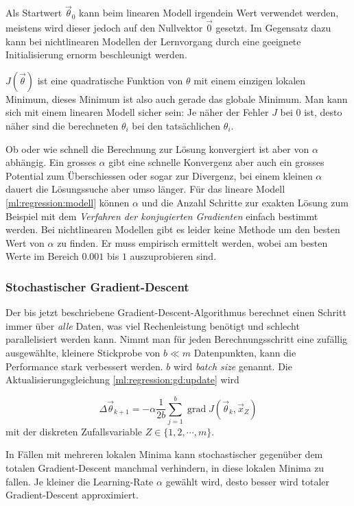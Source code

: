 Als Startwert $\vec\theta_0$ kann beim linearen Modell irgendein Wert verwendet werden, meistens wird dieser jedoch
auf den Nullvektor $\vec 0$ gesetzt. Im Gegensatz dazu kann bei nichtlinearen Modellen der Lernvorgang
durch eine geeignete Initialisierung ernorm beschleunigt werden.

$J(\vec \theta)$ ist eine quadratische Funktion von $\theta$ mit einem einzigen lokalen
Minimum, %
dieses Minimum ist also auch gerade das globale Minimum. Man kann sich mit einem linearen
Modell sicher sein: Je näher der Fehler $J$ bei $0$ ist, desto näher sind die berechneten
$\theta_i$ bei den tatsächlichen $\theta_i$.

Ob oder wie schnell die Berechnung zur Lösung konvergiert ist aber von $\alpha$ abhängig.
Ein grosses $\alpha$ gibt eine schnelle Konvergenz aber auch ein grosses Potential zum
Überschiessen oder sogar zur Divergenz, bei einem kleinen $\alpha$ dauert die Lösungssuche
aber umso länger.
Für das lineare Modell \eqref{ml:regression:modell} können $\alpha$ und die Anzahl Schritte
zur exakten Lösung zum Beispiel mit dem \emph{Verfahren der konjugierten Gradienten}
%
einfach bestimmt werden.
Bei nichtlinearen Modellen gibt es leider keine Methode um den besten Wert von
$\alpha$ zu finden. Er muss empirisch ermittelt werden, wobei am besten Werte im Bereich
$0.001$ bis $1$ auszuprobieren sind. \cite[S. 51]{ml:introduction-to-ml}


\subsubsection{Stochastischer Gradient-Descent}

Der bis jetzt beschriebene Gradient-Descent-Algorithmus berechnet einen Schritt immer über
\emph{alle} Daten, was viel Rechenleistung benötigt und schlecht parallelisiert werden
kann.
Nimmt man für jeden Berechnungsschritt eine zufällig ausgewählte, kleinere Stickprobe von
$b \ll m$ Datenpunkten, kann die Performance stark verbessert werden. $b$ wird
\emph{batch size} genannt. Die Aktualisierungsgleichung \eqref{ml:regression:gd:update} wird

\begin{equation}
  \Delta \vec\theta_{k+1} = - \alpha \frac{1}{2b} \sum_{j=1}^{b} \operatorname{grad} J(\vec
  \theta_k, \vec x_Z)
\end{equation}
mit der diskreten Zufallsvariable $Z \in \{1, 2,\cdots, m\}$.

In Fällen mit mehreren lokalen Minima kann stochastischer gegenüber dem totalen Gradient-Descent manchmal
verhindern, in diese lokalen Minima zu fallen. Je kleiner die Learning-Rate $\alpha$ gewählt
wird, desto besser wird totaler Gradient-Descent approximiert. 
\cite[S. 93ff]{ml:ml-tom-mitchell}

